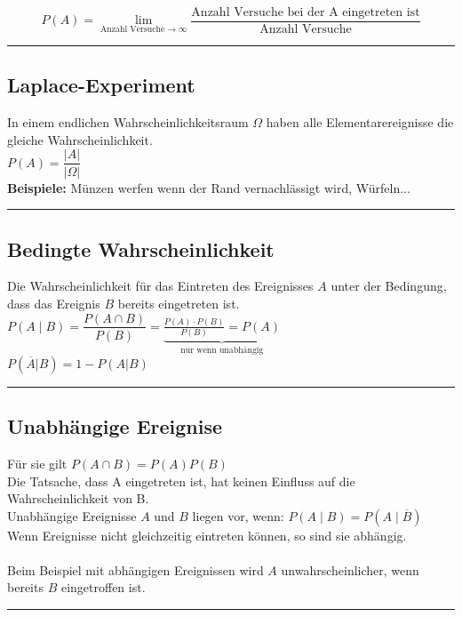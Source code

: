 	\[P(A)=\lim\limits_{\text{Anzahl Versuche} \to \infty} \dfrac{\text{Anzahl Versuche bei der A eingetreten ist}}{\text{Anzahl Versuche}}
	\]
\vspace{.2cm}
\hrule

\subsection{Laplace-Experiment}
	In einem endlichen Wahrscheinlichkeitsraum $\Omega$ haben alle
	Elementarereignisse die gleiche Wahrscheinlichkeit.\\[2pt]
	$\boxed{P(A)=\dfrac{\left| A\right|}{\left|\Omega\right|}}$\\[2pt]
	\textbf{Beispiele:} Münzen werfen wenn der Rand vernachlässigt wird, Würfeln... 
\vspace{.2cm}
\hrule


\subsection{Bedingte Wahrscheinlichkeit}
	Die Wahrscheinlichkeit für das Eintreten des Ereignisses $A$ unter der
	Bedingung, dass das Ereignis $B$ bereits eingetreten ist.\\[.2cm]
	$\boxed{P(A\mid B)= \dfrac{P(A\cap B)}{P(B)}}=\underbrace{\frac{P(A)\cdot
	  P(B)}{P(B)}=P(A)}_{\text{nur wenn unabhängig}}$ \\
		$P(\overline{A}|B) = 1 -
	  P(A|B)$
\vspace{.2cm}
\hrule

\subsection{Unabhängige Ereignise}
	Für sie gilt \hspace*{5mm} $\boxed{P(A\cap B)=P(A)P(B)}$\\
   	Die Tatsache, dass A eingetreten ist, hat keinen Einfluss auf die 
	Wahrscheinlichkeit von B.\\
	Unabhängige Ereignisse $A$ und $B$ liegen vor, wenn: 
	\hspace*{5mm} $P(A\mid B)=P(A\mid \overline{B})$ \\	
	Wenn Ereignisse nicht gleichzeitig eintreten können, so sind sie abhängig.\\
	\\
	Beim Beispiel mit abhängigen Ereignissen wird $A$ unwahrscheinlicher, wenn bereits $B$ eingetroffen ist.  
\vspace{.2cm}
\hrule

